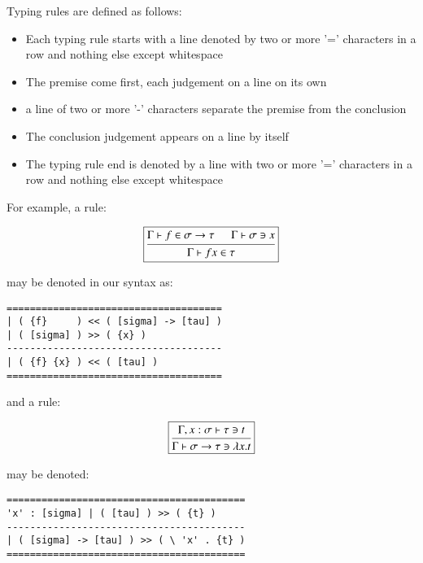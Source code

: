 Typing rules are defined as follows:
\begin{itemize}
  \item Each typing rule starts with a line denoted by two or more '='
    characters in a row and nothing else except whitespace
  \item The premise come first, each judgement on a line on its own
  \item a line of two or more '-' characters separate the premise from
    the conclusion
  \item The conclusion judgement appears on a line by itself
  \item The typing rule end is denoted by a line with two or more '='
    characters in a row and nothing else except whitespace
\end{itemize}

For example, a rule:

$$\boxed{
\mbox{\begin {prooftree}
    \hypo{\Gamma \vdash f \in \sigma \to \tau}
    \hypo{\Gamma \vdash \sigma \ni x}
  \infer2[]{\Gamma \vdash f x \in \tau}
\end {prooftree}}
}$$

may be denoted in our syntax as:

\begin{center}
\begin{BVerbatim}
=====================================
| ( {f}     ) << ( [sigma] -> [tau] )
| ( [sigma] ) >> ( {x} )
-------------------------------------
| ( {f} {x} ) << ( [tau] )
=====================================
\end{BVerbatim}
\end{center}

and a rule:

$$\boxed{
\mbox{\begin {prooftree}
  \hypo{\Gamma , x : \sigma \vdash \tau \ni t }
  \infer1[]{\Gamma \vdash \sigma \to \tau \ni \lambda x . t}
\end {prooftree}}
}$$

may be denoted:

\begin{center}
\begin{BVerbatim}
=========================================
'x' : [sigma] | ( [tau] ) >> ( {t} )
-----------------------------------------
| ( [sigma] -> [tau] ) >> ( \ 'x' . {t} )
=========================================
\end{BVerbatim}
\end{center}

